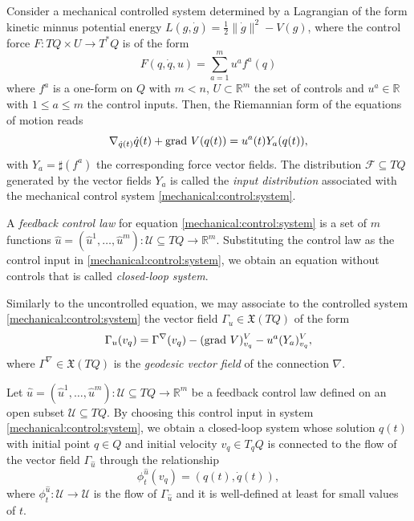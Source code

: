 \documentclass[letterpaper, 10 pt, conference]{ieeeconf}
\newcommand{\grad}{\normalfont{\text{grad}}}
\newcommand{\todo}[1]{
  \vspace{5mm}\par \noindent
  \marginpar{\textsc{ToDo}}
  \framebox{
    \begin{minipage}[c]{0.95\linewidth}
      \tt #1
    \end{minipage}
  }
  \vspace{5mm}\par
}
\begin{document}
Consider a mechanical controlled system determined by a Lagrangian of the form kinetic minnus potential energy $L(g,\dot g)=\tfrac12\|\dot g\|^2 - V(g)$, where the control force $F:TQ\times U \rightarrow T^{*}Q$ is of the form
\begin{equation}\label{force:control}
    F(q,\dot{q},u) = \sum_{a=1}^{m} u^{a}f^{a}(q)
\end{equation}
where $f^{a}$ is a one-form on $Q$ with $m<n$, $U\subset\mathbb{R}^{m}$ the set of controls and $u^a\in\mathbb{R}$ with $1\leq a\leq m$ the control inputs. Then, the Riemannian form of the equations of motion reads
\begin{equation}\label{mechanical:control:system}
    \nabla_{\dot{q}(t)} \dot{q}(t) + \grad \ V (q(t))= u^{a}(t)Y_{a}(q(t)),
\end{equation}
with $Y_{a}=\sharp(f^{a})$ the corresponding force vector fields. The distribution $\mathcal{F}\subseteq TQ$ generated by the vector fields  $Y_{a}$ is called the \textit{input distribution} associated with the mechanical control system \eqref{mechanical:control:system}.%

A \textit{feedback control law} for equation \eqref{mechanical:control:system} is a set of $m$ functions $\hat{u}=(\hat{u}^{1}, \ldots, \hat{u}^{m}):\mathcal{U}\subseteq TQ \rightarrow \mathbb{R}^{m}$. Substituting the control law as the control input in \eqref{mechanical:control:system}, we obtain an equation without controls that is called \textit{closed-loop system}.


Similarly to the uncontrolled equation, we may associate to the controlled system \eqref{mechanical:control:system} the vector field $\Gamma_{u}\in \mathfrak{X}(TQ)$ of the form
$$\Gamma_{u}(v_{q}) = \Gamma^{\nabla}(v_{q}) - (\grad \ V)^{V}_{v_{q}} - u^{a} (Y_{a})^{V}_{v_{q}},$$ where $\Gamma^{\nabla} \in \mathfrak{X}(TQ)$ is the \textit{geodesic vector field} of the connection $\nabla$. 


Let $\hat{u}=(\hat{u}^{1}, \ldots, \hat{u}^{m}):\mathcal{U}\subseteq TQ \rightarrow \mathbb{R}^{m}$ be a feedback control law defined on an open subset $\mathcal{U}\subseteq TQ$. By choosing this control input in system \eqref{mechanical:control:system}, we obtain a closed-loop system whose solution $q(t)$ with initial point $q\in Q$ and initial velocity $v_{q}\in T_{q}Q$ is connected to the flow of the vector field $\Gamma_{\hat{u}}$ through the relationship $$\phi_{t}^{\hat{u}}(v_{q})=(q(t), \dot{q}(t)),$$ where $\phi_{t}^{\hat{u}}:\mathcal{U} \to \mathcal{U}$ is the flow of $\Gamma_{\hat{u}}$ and it is well-defined at least for small values of $t$.
\end{document}
